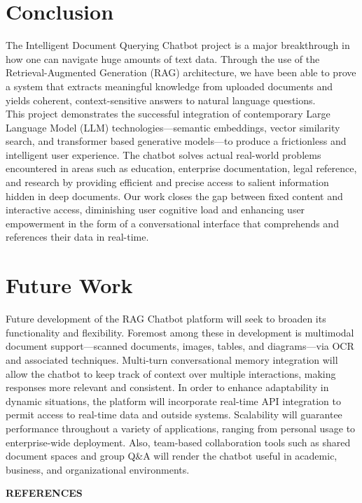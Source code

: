 \documentclass[12pt]{report}
\begin{document}
\section{Conclusion}
The Intelligent Document Querying Chatbot project is a major breakthrough in how one can navigate huge amounts of text data. Through the use of the Retrieval-Augmented Generation (RAG) architecture, we have been able to prove a system that extracts meaningful knowledge from uploaded documents and yields coherent, context-sensitive answers to natural language questions.
\\ 
This project demonstrates the successful integration of contemporary Large Language Model (LLM) technologies—semantic embeddings, vector similarity search, and transformer based generative models—to produce a frictionless and intelligent user experience. The chatbot solves actual real-world problems encountered in areas such as education, enterprise documentation, legal reference, and research by providing efficient and precise access to salient information hidden in deep documents.
Our work closes the gap between fixed content and interactive access, diminishing user cognitive load and enhancing user empowerment in the form of a conversational interface that comprehends and references their data in real-time.


\section{Future Work}
Future development of the RAG Chatbot platform will seek to broaden its functionality and flexibility. Foremost among these in development is multimodal document support—scanned documents, images, tables, and diagrams—via OCR and associated techniques. Multi-turn conversational memory integration will allow the chatbot to keep track of context over multiple interactions, making responses more relevant and consistent.
In order to enhance adaptability in dynamic situations, the platform will incorporate real-time API integration to permit access to real-time data and outside systems. Scalability will guarantee performance throughout a variety of applications, ranging from personal usage to enterprise-wide deployment. Also, team-based collaboration tools such as shared document spaces and group Q&A will render the chatbot useful in academic, business, and organizational environments.

\newpage
\begin{center}
    \Large \textbf{REFERENCES}
\end{center}
\end{document}
